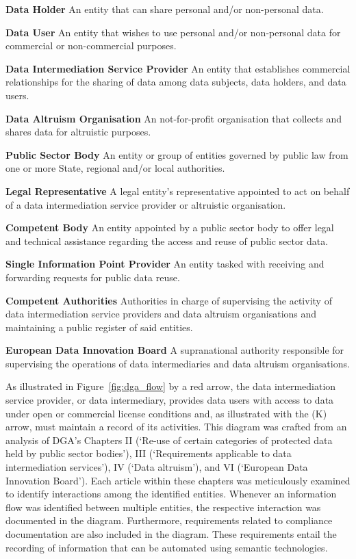 \textbf{Data Holder} An entity that can share personal and/or non-personal data.

\textbf{Data User} An entity that wishes to use personal and/or non-personal data for commercial or non-commercial purposes.

\textbf{Data Intermediation Service Provider} An entity that establishes commercial relationships for the sharing of data among data subjects, data holders, and data users.

\textbf{Data Altruism Organisation} An not-for-profit organisation that collects and shares data for altruistic purposes.

\textbf{Public Sector Body} An entity or group of entities governed by public law from one or more State, regional and/or local authorities.

\textbf{Legal Representative} A legal entity's representative appointed to act on behalf of a data intermediation service provider or altruistic organisation.

\textbf{Competent Body} An entity appointed by a public sector body to offer legal and technical assistance regarding the access and reuse of public sector data.

\textbf{Single Information Point Provider} An entity tasked with receiving and forwarding requests for public data reuse.

\textbf{Competent Authorities} Authorities in charge of supervising the activity of data intermediation service providers and data altruism organisations and maintaining a public register of said entities.

\textbf{European Data Innovation Board} A supranational authority responsible for supervising the operations of data intermediaries and data altruism organisations.

As illustrated in Figure~\ref{fig:dga_flow} by a red arrow, the data intermediation service provider, or data intermediary, provides data users with access to data under open or commercial license conditions and, as illustrated with the (K) arrow, must maintain a record of its activities.
This diagram was crafted from an analysis of DGA's Chapters II (`Re-use of certain categories of protected data held by public sector bodies'), III (`Requirements applicable to data intermediation services'), IV (`Data altruism'), and VI (`European Data Innovation Board').
Each article within these chapters was meticulously examined to identify interactions among the identified entities.
Whenever an information flow was identified between multiple entities, the respective interaction was documented in the diagram.
Furthermore, requirements related to compliance documentation are also included in the diagram.
These requirements entail the recording of information that can be automated using semantic technologies.

